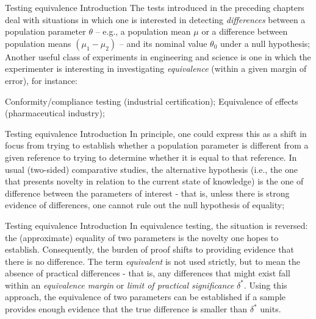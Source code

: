 \documentclass[t]{beamer}
\begin{document}

\begin{ftst}
{Testing equivalence}
{Introduction}
The tests introduced in the preceding chapters deal with situations in which one is interested in detecting \textit{differences} between a population parameter $\theta$ -- e.g., a population mean $\mu$ or a difference between population means $(\mu_1-\mu_2)$ -- and its nominal value $\theta_0$ under a null hypothesis;
\vone
Another useful class of experiments in engineering and science is one in which the experimenter is interesting in investigating \textit{equivalence} (within a given margin of error), for instance:

\bitems Conformity/compliance testing (industrial certification);
\spitem Equivalence of effects (pharmaceutical industry);
\eitem
{}
\end{ftst}


\begin{ftst}
{Testing equivalence}
{Introduction}
In principle, one could express this as a shift in focus from trying to establish whether a population parameter is different from a given reference to trying to determine whether it is equal to that reference. 
\vone
In usual (two-sided) comparative studies, the alternative hypothesis (i.e., the one that presents novelty in relation to the current state of knowledge) is the one of difference between the parameters of interest - that is, unless there is strong evidence of differences, one cannot rule out the null hypothesis of equality;
\end{ftst}


\begin{ftst}
{Testing equivalence}
{Introduction}
In equivalence testing, the situation is reversed: the (approximate) equality of two parameters is the novelty one hopes to establish. Consequently, the burden of proof shifts to providing evidence that there is no difference.
\vone
The term \textit{equivalent} is not used strictly, but to mean the absence of practical differences - that is, any differences that might exist fall within an \textit{equivalence margin} or \textit{limit of practical significance} $\delta^*$.
\vone
Using this approach, the equivalence of two parameters can be established if a sample provides enough evidence that the true difference is smaller than $\delta^*$ units.
\end{ftst}
\end{document}
